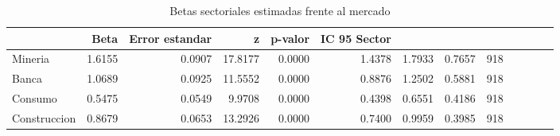 \begin{table}
\caption{Betas sectoriales estimadas frente al mercado}
\label{tab:tabla4_betas}
\begin{tabular}{lrrrrrrrr}
\toprule
 & Beta & Error estandar & z & p-valor & IC 95%
Sector &  &  &  &  &  &  &  &  \\
\midrule
Mineria & 1.6155 & 0.0907 & 17.8177 & 0.0000 & 1.4378 & 1.7933 & 0.7657 & 918 \\
Banca & 1.0689 & 0.0925 & 11.5552 & 0.0000 & 0.8876 & 1.2502 & 0.5881 & 918 \\
Consumo & 0.5475 & 0.0549 & 9.9708 & 0.0000 & 0.4398 & 0.6551 & 0.4186 & 918 \\
Construccion & 0.8679 & 0.0653 & 13.2926 & 0.0000 & 0.7400 & 0.9959 & 0.3985 & 918 \\
\bottomrule
\end{tabular}
\end{table}
